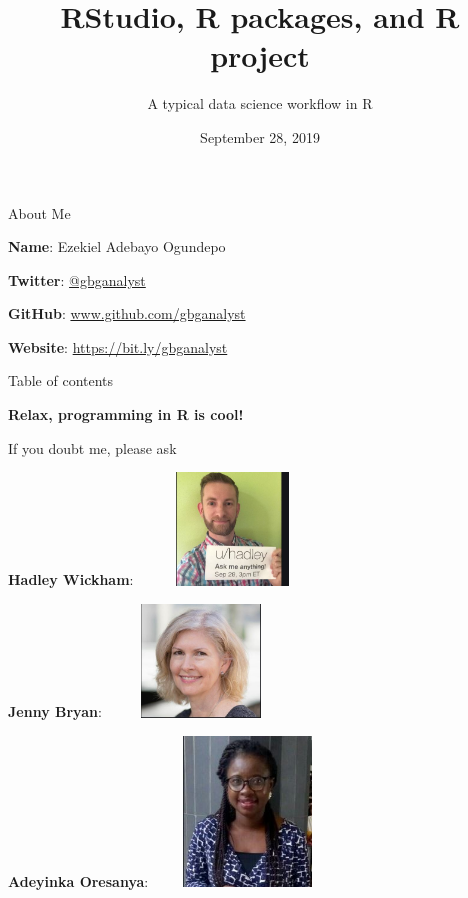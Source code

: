 \documentclass[
  ignorenonframetext,
]{beamer}
\title{RStudio, R packages, and R project}
\subtitle{A typical data science workflow in R}
\date{September 28, 2019}
\begin{document}
\frame{\titlepage}


\begin{frame}{About Me}
\protect\hypertarget{about-me}{}
\pause

\textbf{Name}: Ezekiel Adebayo Ogundepo \pause

\textbf{Twitter}: \href{https://twitter.com/gbganalyst}{@gbganalyst}
\pause

\textbf{GitHub}: \url{www.github.com/gbganalyst} \pause

\textbf{Website}: \url{https://bit.ly/gbganalyst}

\end{frame}

\begin{frame}{Table of contents}
	\tableofcontents[hideallsubsections]
\end{frame}

\begin{frame}

\begin{center}
\textbf{Relax, programming in R is cool!}
\end{center}
\pause
If you doubt me, please ask \pause

\begin{multicols}{3}
\textbf{Hadley Wickham}: \includegraphics[height=3cm, width=5cm]{Images/Hadley.JPG}

\pause
\textbf{Jenny Bryan}: \includegraphics[height=3cm, width=5cm]{Images/Jenny.JPG} \pause

\textbf{Adeyinka
Oresanya}: \includegraphics[height=4cm, width=5cm]{Images/Oresanya.JPG}

\end{multicols}
\end{frame}
\end{document}
